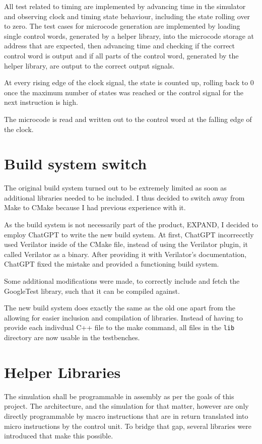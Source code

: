 All test related to timing are implemented by advancing time in the simulator and observing clock and timing state behaviour, including the state rolling over to zero. The test cases for microcode generation are implemented by loading single control words, generated by a helper library, into the microcode storage at address that are expected, then advancing time and checking if the correct control word is output and if all parts of the control word, generated by the helper library, are output to the correct output signals. 

At every rising edge of the clock signal, the state is counted up, rolling back to 0 once the maximum number of states was reached or the control signal for the next instruction is high.


The microcode is read and written out to the control word at the falling edge of the clock. 

\section{Build system switch}
The original build system turned out to be extremely limited as soon as additional libraries needed to be included. I thus decided to switch away from Make to CMake because I had previous experience with it.

As the build system is not necessarily part of the product, EXPAND, I decided to employ ChatGPT \cite{chatgptbuildsystem} to write the new build system. At first, ChatGPT incorrecctly used Verilator inside of the CMake file, instead of using the Verilator plugin, it called Verilator as a binary. After providing it with Verilator's documentation, ChatGPT fixed the mistake and provided a functioning build system. 

Some additional modifications were made, to correctly include and fetch the GoogleTest library, such that it can be compiled against. 

The new build system does exactly the same as the old one apart from the allowing for easier inclusion and compilation of libraries. Instead of having to provide each indivdual C++ file to the make command, all files in the \texttt{lib} directory are now usable in the testbenches.

\section{Helper Libraries}
The simulation shall be programmable in assembly as per the goals of this project. The architecture, and the simulation for that matter, however are only directly programmable by macro instructions that are in return translated into micro instructions by the control unit. To bridge that gap, several libraries were introduced that make this possible. 


